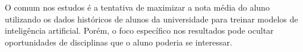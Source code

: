 O comum nos estudos é a tentativa de maximizar a nota média do aluno utilizando os dados históricos de alunos da universidade para treinar modelos de inteligência artificial.\cite{rani-machine-learning,nguyen-learning-outcome,adak-fuzzy,adak-svm} Porém, o foco específico nos resultados pode ocultar oportunidades de disciplinas que o aluno poderia se interessar.


